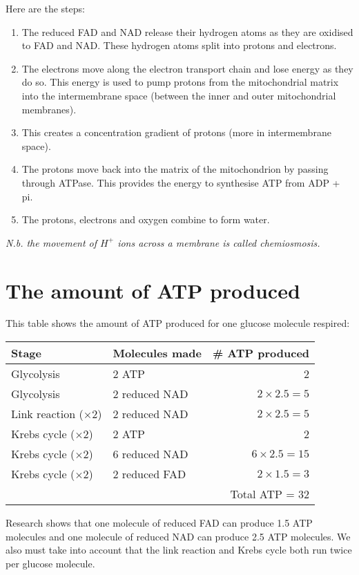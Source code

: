 \documentclass{article}
\begin{document}
Here are the steps:
\begin{enumerate}
	\item The reduced FAD and NAD release their hydrogen atoms as they are oxidised to FAD and NAD. These hydrogen atoms split into protons and electrons.
	\item The electrons move along the electron transport chain and lose energy as they do so. This energy is used to pump protons from the mitochondrial matrix into the intermembrane space (between the inner and outer mitochondrial membranes).
	\item This creates a concentration gradient of protons (more in intermembrane space).
	\item The protons move back into the matrix of the mitochondrion by passing through ATPase. This provides the energy to synthesise ATP from ADP + pi.
	\item The protons, electrons and oxygen combine to form water.
\end{enumerate}

\textit{N.b. the movement of $H^+$ ions across a membrane is called chemiosmosis.}

\section*{The amount of ATP produced}
This table shows the amount of ATP produced for one glucose molecule respired:

\begin{center}
	\begin{tabular}{|l|l|r|}
		\hline
			Stage & Molecules made & \# ATP produced\\ \hline
			Glycolysis & 2 ATP & 2\\ \hline
			Glycolysis & 2 reduced NAD & $2 \times 2.5 = 5$\\ \hline
			Link reaction ($\times 2$) & 2 reduced NAD & $2 \times 2.5 = 5$\\ \hline
			Krebs cycle ($\times 2$) & 2 ATP & 2\\ \hline
			Krebs cycle ($\times 2$) & 6 reduced NAD & $6 \times 2.5 = 15$\\ \hline
			Krebs cycle ($\times 2$) & 2 reduced FAD & $2 \times 1.5 = 3$\\ \hline
			\multicolumn{3}{|r|}{Total ATP = 32}\\ \hline
	\end{tabular}
\end{center}

Research shows that one molecule of reduced FAD can produce 1.5 ATP molecules and one molecule of reduced NAD can produce 2.5 ATP molecules. We also must take into account that the link reaction and Krebs cycle both run twice per glucose molecule.
\end{document}
